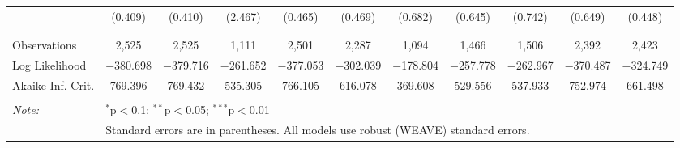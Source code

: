 \documentclass[a4paper]{article}\usepackage[]{graphicx}\usepackage[]{color}
\begin{document}
\begin{table}
\begin{center}
{\begin{tabular}{@{\extracolsep{5pt}}lcccccccccc}
  & (0.409) & (0.410) & (2.467) & (0.465) & (0.469) & (0.682) & (0.645) & (0.742) & (0.649) & (0.448) \\ 
  & & & & & & & & & & \\ 
\hline \\[-1.8ex] 
Observations & 2,525 & 2,525 & 1,111 & 2,501 & 2,287 & 1,094 & 1,466 & 1,506 & 2,392 & 2,423 \\ 
Log Likelihood & $-$380.698 & $-$379.716 & $-$261.652 & $-$377.053 & $-$302.039 & $-$178.804 & $-$257.778 & $-$262.967 & $-$370.487 & $-$324.749 \\ 
Akaike Inf. Crit. & 769.396 & 769.432 & 535.305 & 766.105 & 616.078 & 369.608 & 529.556 & 537.933 & 752.974 & 661.498 \\ 
\hline 
\hline \\[-1.8ex] 
\textit{Note:}  & \multicolumn{10}{l}{$^{*}$p$<$0.1; $^{**}$p$<$0.05; $^{***}$p$<$0.01} \\ 
 & \multicolumn{10}{l}{Standard errors are in parentheses. All models use robust (WEAVE) standard errors.} \\ 
\end{tabular} 

}
\end{center}
\end{table}



\end{document}
